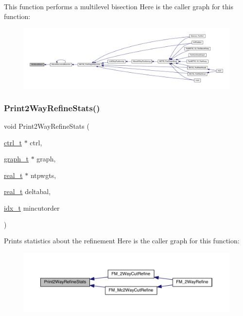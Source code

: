 This function performs a multilevel bisection Here is the caller graph for this function\+:\nopagebreak
\begin{figure}[H]
\begin{center}
\leavevmode
\includegraphics[width=350pt]{a00945_a33c48a23cc94ea0221fa5c7317cd0222_icgraph}
\end{center}
\end{figure}
\mbox{\label{a00945_a6e4663b4acc63be2c1b33533e7827f1a}} 
\subsubsection{\texorpdfstring{Print2\+Way\+Refine\+Stats()}{Print2WayRefineStats()}}
{\footnotesize\ttfamily void Print2\+Way\+Refine\+Stats (\begin{DoxyParamCaption}\item[{\hyperlink{a00742}{ctrl\+\_\+t} $\ast$}]{ctrl,  }\item[{\hyperlink{a00734}{graph\+\_\+t} $\ast$}]{graph,  }\item[{\hyperlink{a00876_a1924a4f6907cc3833213aba1f07fcbe9}{real\+\_\+t} $\ast$}]{ntpwgts,  }\item[{\hyperlink{a00876_a1924a4f6907cc3833213aba1f07fcbe9}{real\+\_\+t}}]{deltabal,  }\item[{\hyperlink{a00876_aaa5262be3e700770163401acb0150f52}{idx\+\_\+t}}]{mincutorder }\end{DoxyParamCaption})}

Prints statistics about the refinement Here is the caller graph for this function\+:\nopagebreak
\begin{figure}[H]
\begin{center}
\leavevmode
\includegraphics[width=350pt]{a00945_a6e4663b4acc63be2c1b33533e7827f1a_icgraph}
\end{center}
\end{figure}
\mbox{\label{a00945_aac3e480e7e3bd02bfdf001d858a93562}} 
